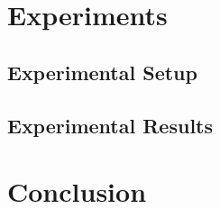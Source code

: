 \documentclass{article}
\begin{document}
\section{Experiments}
\label{sec:experiments}

\subsection{Experimental Setup}

\subsection{Experimental Results}

\section{Conclusion}




\newpage
\appendix

\end{document}
